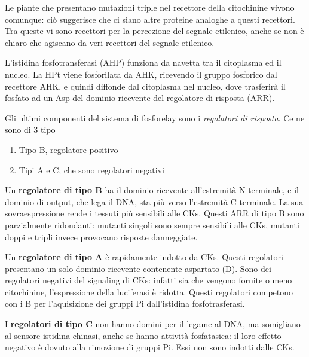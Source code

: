 \documentclass[a4paper,12pt]{book}
\begin{document}
Le piante che presentano mutazioni triple nel recettore della citochinine vivono comunque: ciò suggerisce che ci siano altre proteine analoghe a questi recettori. Tra queste vi sono recettori per la percezione del segnale etilenico, anche se non è chiaro che agiscano da veri recettori del segnale etilenico. 

L’istidina fosfotransferasi (AHP) funziona da navetta tra il citoplasma ed il nucleo. 
La HPt viene fosforilata da AHK, ricevendo il gruppo fosforico dal recettore AHK, e quindi diffonde dal
citoplasma nel nucleo, dove trasferirà il fosfato ad un Asp del dominio ricevente del regolatore di
risposta (ARR).

Gli ultimi componenti del sistema di fosforelay sono i \emph{regolatori di risposta}. Ce ne sono di 3 tipo
\begin{enumerate} 
\item{Tipo B, regolatore positivo} 
\item{Tipi A e C, che sono regolatori negativi}
\end{enumerate}

Un \textbf{regolatore di tipo B} ha il dominio ricevente all'estremità N-terminale, e il dominio di output, che lega il DNA, sta più verso l'estremità C-terminale. La sua sovraespressione rende i tessuti più sensibili alle CKs. Questi ARR di tipo B sono parzialmente ridondanti: mutanti singoli sono sempre sensibili alle CKs, mutanti doppi e tripli invece provocano risposte danneggiate.

Un \textbf{regolatore di tipo A} è rapidamente indotto da CKs. Questi regolatori presentano un solo dominio ricevente contenente aspartato (D). Sono dei regolatori negativi del signaling di CKs: infatti sia che vengono fornite o meno citochinine, l'espressione della luciferasi è ridotta. Questi regolatori competono con i B per l'aquisizione dei gruppi Pi dall'istidina fosfotrasferasi.

I \textbf{regolatori di tipo C} non hanno domini per il legame al DNA, ma somigliano al sensore istidina chinasi, anche se hanno attività fosfatasica: il loro effetto negativo è dovuto alla rimozione di gruppi Pi. Essi non sono indotti dalle CKs.
\end{document}
